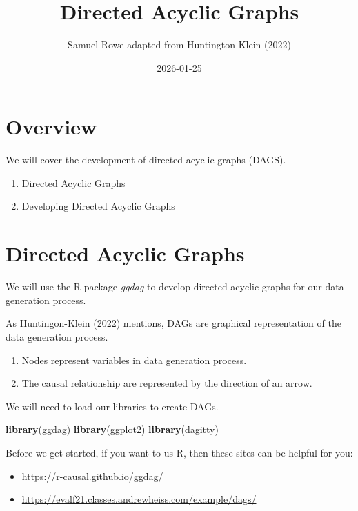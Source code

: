 \documentclass[
]{book}
\title{Directed Acyclic Graphs}
\author{Samuel Rowe adapted from Huntington-Klein (2022)}
\date{2026-01-25}
\newenvironment{Shaded}{\begin{snugshade}}{\end{snugshade}}
\newcommand{\FunctionTok}[1]{\textcolor[rgb]{0.13,0.29,0.53}{\textbf{#1}}}
\newcommand{\NormalTok}[1]{#1}
\providecommand{\tightlist}{%
  \setlength{\itemsep}{0pt}\setlength{\parskip}{0pt}}
\begin{document}
\maketitle

{
\setcounter{tocdepth}{1}
\tableofcontents
}
\chapter*{Overview}\label{overview}

We will cover the development of directed acyclic graphs (DAGS).

\begin{enumerate}
\def\labelenumi{\arabic{enumi}.}
\tightlist
\item
  Directed Acyclic Graphs
\item
  Developing Directed Acyclic Graphs
\end{enumerate}

\chapter{Directed Acyclic Graphs}\label{directed-acyclic-graphs}

We will use the R package \emph{ggdag} to develop directed acyclic graphs for our data generation process.

As Huntingon-Klein (2022) mentions, DAGs are graphical representation of the data generation process.

\begin{enumerate}
\def\labelenumi{\arabic{enumi}.}
\tightlist
\item
  Nodes represent variables in data generation process.
\item
  The causal relationship are represented by the direction of an arrow.
\end{enumerate}

We will need to load our libraries to create DAGs.

\begin{Shaded}
\begin{Highlighting}[]
\FunctionTok{library}\NormalTok{(ggdag)}
\FunctionTok{library}\NormalTok{(ggplot2)}
\FunctionTok{library}\NormalTok{(dagitty)}
\end{Highlighting}
\end{Shaded}

Before we get started, if you want to us R, then these sites can be helpful for you:

\begin{itemize}
\tightlist
\item
  \url{https://r-causal.github.io/ggdag/}
\item
  \url{https://evalf21.classes.andrewheiss.com/example/dags/}
\end{itemize}
\end{document}
